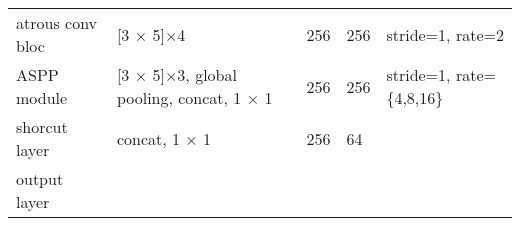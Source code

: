 \documentclass[]{article}
\begin{document}
\begin{longtable}[]{@{}lllll@{}}
\begin{minipage}[t]{0.17\columnwidth}
atrous conv bloc\strut
\end{minipage} & \begin{minipage}[t]{0.17\columnwidth}\raggedright
{[}3 × 5{]}×4\strut
\end{minipage} & \begin{minipage}[t]{0.17\columnwidth}\raggedright
256\strut
\end{minipage} & \begin{minipage}[t]{0.17\columnwidth}\raggedright
256\strut
\end{minipage} & \begin{minipage}[t]{0.17\columnwidth}\raggedright
stride=1, rate=2\strut
\end{minipage}\tabularnewline
\begin{minipage}[t]{0.17\columnwidth}\raggedright
ASPP module\strut
\end{minipage} & \begin{minipage}[t]{0.17\columnwidth}\raggedright
{[}3 × 5{]}×3, global pooling, concat, 1 × 1\strut
\end{minipage} & \begin{minipage}[t]{0.17\columnwidth}\raggedright
256\strut
\end{minipage} & \begin{minipage}[t]{0.17\columnwidth}\raggedright
256\strut
\end{minipage} & \begin{minipage}[t]{0.17\columnwidth}\raggedright
stride=1, rate=\{4,8,16\}\strut
\end{minipage}\tabularnewline
\begin{minipage}[t]{0.17\columnwidth}\raggedright
shorcut layer\strut
\end{minipage} & \begin{minipage}[t]{0.17\columnwidth}\raggedright
concat, 1 × 1\strut
\end{minipage} & \begin{minipage}[t]{0.17\columnwidth}\raggedright
256\strut
\end{minipage} & \begin{minipage}[t]{0.17\columnwidth}\raggedright
64\strut
\end{minipage} & \begin{minipage}[t]{0.17\columnwidth}\raggedright
\strut
\end{minipage}\tabularnewline
\begin{minipage}[t]{0.17\columnwidth}\raggedright
output layer\strut
\end{minipage} & \begin{minipage}[t]{0.17\columnwidth}\raggedright

\end{minipage}
\end{longtable}
\end{document}
